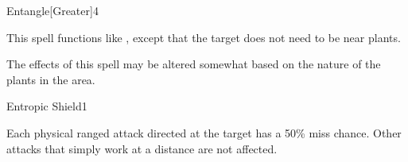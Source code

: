 \begin{spellsection}{Entangle}[Greater]{4}
\begin{spellheader}
\end{spellheader}
\begin{spellcontent}
    \begin{spelltargetinginfo}
    \end{spelltargetinginfo}
    \begin{spelleffects}
        \spellspecial This spell functions like , except that the target does not need to be near plants.
    \end{spelleffects}
\end{spellcontent}
\begin{spellfooter}
    \spellnotes The effects of this spell may be altered somewhat based on the nature of the plants in the area.
\end{spellfooter}
\end{spellsection}

\begin{spellsection}{Entropic Shield}{1}
\begin{spellheader}
\end{spellheader}
\begin{spellcontent}
    \begin{spelltargetinginfo}
    \end{spelltargetinginfo}
    \begin{spelleffects}
        \spelleffect Each physical ranged attack directed at the target has a 50\% miss chance. Other attacks that simply work at a distance are not affected.
        \spelldur \durshort \dismissable
    \end{spelleffects}
\end{spellcontent}
\begin{spellfooter}
\end{spellfooter}
\end{spellsection}

